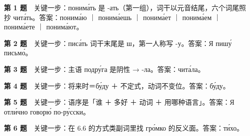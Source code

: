\textbf{第 1 题}　关键一步：понима́ть 是 -ать（第一组），词干以元音结尾，六个词尾照抄 чита́ть。答案：понима́ю ｜ понима́ешь ｜ понима́ет ｜ понима́ем ｜ понима́ете ｜ понима́ют。

\textbf{第 2 题}　关键一步：писа́ть 词干末尾是 ш，第一人称写 -у。答案：Я пишу́ письмо́。

\textbf{第 3 题}　关键一步：主语 подру́га 是阴性 → -ла。答案：чита́ла。

\textbf{第 4 题}　关键一步：将来时＝бу́ду ＋ 不定式，动词不变位。答案：бу́ду。

\textbf{第 5 题}　关键一步：语序是「谁 ＋ 多好 ＋ 动词 ＋ 用哪种语言」。答案：Я отли́чно говорю́ по-ру́сски。

\textbf{第 6 题}　关键一步：在 6.6 的方式类副词里找 гро́мко 的反义面。答案：ти́хо。
